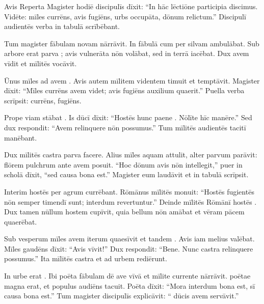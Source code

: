\documentclass[12pt]{nextbook}
\begin{document}
\begin{readersection}{Avis Reperta}
Magister hodiē discipulīs dīxit: “In hāc lēctiōne participia discimus. Vidēte: mīles currēns, avis fugiēns, urbs occupāta, dōnum relictum.” Discipulī audientēs verba in tabulā scrībēbant.

Tum magister fābulam novam nārrāvit. In fābulā  cum  per silvam ambulābat. Sub arbore erat parva ; avis vulnerāta nōn volābat, sed in terrā iacēbat. Dux avem vīdit et  mīlitēs vocāvit.

Ūnus mīles ad avem . Avis autem mīlitem videntem timuit et  temptāvit. Magister dīxit: “Mīles currēns avem videt; avis fugiēns auxilium quaerit.” Puella verba scrīpsit: currēns, fugiēns.

Prope viam stābat . Is dūcī dīxit: “Hostēs hunc  paene . Nōlīte hīc manēre.” Sed dux respondit: “Avem  relinquere nōn possumus.” Tum mīlitēs audientēs tacitī manēbant.

Dux mīlitēs  castra parva facere. Alius mīles aquam attulit, alter parvum  parāvit: flōrem pulchrum ante avem posuit. “Hoc dōnum avis nōn intellegit,” puer in scholā dīxit, “sed causa bona est.” Magister eum laudāvit et  in tabulā scrīpsit.

Interim hostēs per agrum currēbant.  Rōmānus mīlitēs monuit: “Hostēs fugientēs nōn semper timendī sunt; interdum revertuntur.” Deinde mīlitēs Rōmānī hostēs . Dux tamen nūllum hostem  cupīvit, quia bellum nōn amābat et vēram pācem quaerēbat.

Sub vesperum mīles avem iterum quaesīvit et tandem . Avis iam melius valēbat. Mīles gaudēns dīxit: “Avis vīvit!” Dux respondit: “Bene. Nunc castra relinquere possumus.” Ita mīlitēs castra  et ad urbem rediērunt.

In urbe erat . Ibi poēta fābulam dē ave vīvā et mīlite currente nārrāvit.  poētae magna erat, et populus audiēns tacuit. Poēta dīxit: “Mora interdum bona est, sī causa bona est.” Tum magister discipulīs explicāvit: “ dūcis avem servāvit.”


\end{readersection}
\end{document}
